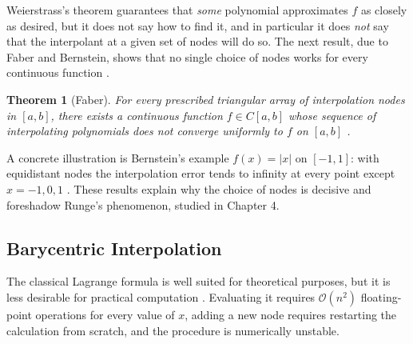 \documentclass[12pt, a4paper]{article}
\theoremstyle{plain}
\newtheorem{theorem}{Theorem}[section]
\theoremstyle{definition}
\theoremstyle{remark}
\begin{document}
Weierstrass's theorem guarantees that \emph{some} polynomial approximates $f$ as closely as desired, but it does not say how to find it, and in particular it does \emph{not} say that the interpolant at a given set of nodes will do so. The next result, due to Faber and Bernstein, shows that no single choice of nodes works for every continuous function \cite{schatzman}.

\begin{theorem}[Faber]\label{thm:faber}
For every prescribed triangular array of interpolation nodes in $[a,b]$, there exists a continuous function $f \in C[a,b]$ whose sequence of interpolating polynomials does not converge uniformly to $f$ on $[a,b]$ \cite{micula4}.
\end{theorem}

A concrete illustration is Bernstein's example $f(x) = |x|$ on $[-1,1]$: with equidistant nodes the interpolation error tends to infinity at every point except $x = -1, 0, 1$ \cite{micula4}. These results explain why the choice of nodes is decisive and foreshadow Runge's phenomenon, studied in Chapter 4.

\subsection{Barycentric Interpolation}

The classical Lagrange formula is well suited for theoretical purposes, but it is less desirable for practical computation \cite{micula4}. Evaluating it requires $\mathcal{O}(n^2)$ floating-point operations for every value of $x$, adding a new node requires restarting the calculation from scratch, and the procedure is numerically unstable.
\end{document}
